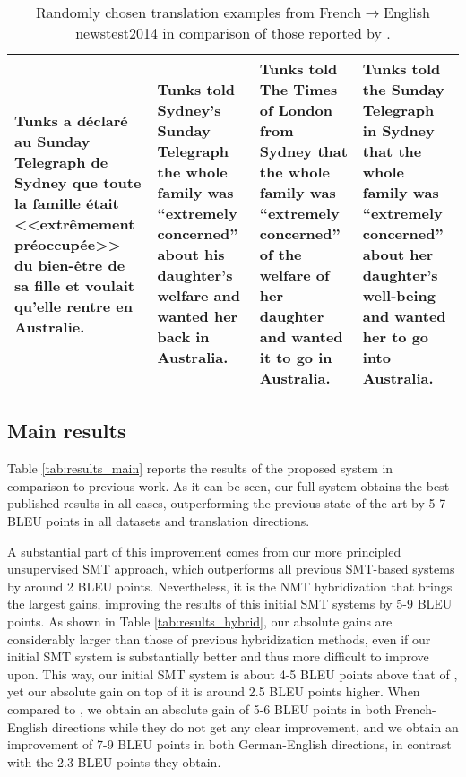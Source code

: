 \documentclass[11pt,a4paper]{article}
\begin{document}
\begin{table*}[t]
\begin{small}
\begin{center}
\begin{tabular}{p{3.82cm}p{3.46cm}p{3.48cm}p{3.67cm}}
    \\
    \midrule
	Tunks a déclaré au Sunday Telegraph de Sydney que toute la famille était <<extrêmement préoccupée>> du bien-être de sa fille et voulait qu'elle rentre en Australie.
	& Tunks told Sydney's Sunday Telegraph the whole family was ``extremely concerned'' about his daughter's welfare and wanted her back in Australia.
	& Tunks told The Times of London from Sydney that the whole family was ``extremely concerned'' of the welfare of her daughter and wanted it to go in Australia.
	& Tunks told the Sunday Telegraph in Sydney that the whole family was ``extremely concerned'' about her daughter's well-being and wanted her to go into Australia.
	\\
    \bottomrule
  \end{tabular}
\end{center}
\end{small}
\caption{Randomly chosen translation examples from French$\rightarrow$English newstest2014 in comparison of those reported by \citet{artetxe2018usmt}.} \label{tab:examples}
\end{table*}


\subsection{Main results} \label{subsec:results_main}

Table \ref{tab:results_main} reports the results of the proposed system in comparison to previous work. As it can be seen, our full system obtains the best published results in all cases, outperforming the previous state-of-the-art by 5-7 BLEU points in all datasets and translation directions.

A substantial part of this improvement comes from our more principled unsupervised SMT approach, which outperforms all previous SMT-based systems by around 2 BLEU points. Nevertheless, it is the NMT hybridization that brings the largest gains, improving the results of this initial SMT systems by 5-9 BLEU points. As shown in Table \ref{tab:results_hybrid}, our absolute gains are considerably larger than those of previous hybridization methods, even if our initial SMT system is substantially better and thus more difficult to improve upon. This way, our initial SMT system is about 4-5 BLEU points above that of \citet{marie2018unsupervised}, yet our absolute gain on top of it is around 2.5 BLEU points higher. When compared to \citet{lample2018phrase}, we obtain an absolute gain of 5-6 BLEU points in both French-English directions while they do not get any clear improvement, and we obtain an improvement of 7-9 BLEU points in both German-English directions, in contrast with the 2.3 BLEU points they obtain.
\end{document}
